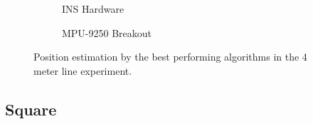 \begin{figure}[!h]
    \centering
    \begin{subfigure}{0.49\textwidth}
        \centering
        \resizebox{1\linewidth}{!}{}
        \caption{INS Hardware}
        \label{fig:triangle16_2D}
    \end{subfigure}
    \begin{subfigure}{0.49\textwidth}
        \centering
        \resizebox{1\linewidth}{!}{}
        \caption{MPU-9250 Breakout}
        \label{fig:triangle16_3D}
    \end{subfigure}
    \caption{Position estimation by the best performing algorithms in the 4 meter line experiment.}
    \label{fig:triangle16}
\end{figure}



%     


\subsection{Square}

